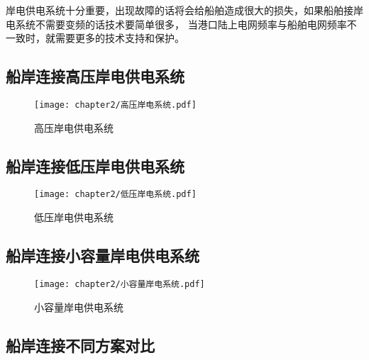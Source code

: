 岸电供电系统十分重要，出现故障的话将会给船舶造成很大的损失，如果船舶接岸电系统不需要变频的话技术要简单很多，
当港口陆上电网频率与船舶电网频率不一致时，就需要更多的技术支持和保护。

\subsection{船岸连接高压岸电供电系统}

\begin{figure}[!htp]
	\centering
	\texttt{[image: chapter2/高压岸电系统.pdf]}
	\caption{高压岸电供电系统}
	\label{fig:高压岸电供电系统}
\end{figure}

\subsection{船岸连接低压岸电供电系统}

\begin{figure}[!htp]
	\centering
	\texttt{[image: chapter2/低压岸电系统.pdf]}
	\caption{低压岸电供电系统}
	\label{fig:低压岸电供电系统}
\end{figure}

\subsection{船岸连接小容量岸电供电系统}

\begin{figure}[!htp]
	\centering
	\texttt{[image: chapter2/小容量岸电系统.pdf]}
	\caption{小容量岸电供电系统}
	\label{fig:小容量岸电供电系统}
\end{figure}

\subsection{船岸连接不同方案对比}


